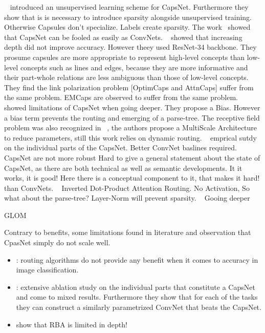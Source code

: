 \documentclass{article}
\begin{document}
~\cite{corr/Rawlinson2018} introduced an unsupervised learning scheme for CapsNet. Furthermore they show that is is necessary to introduce sparsity alongside unsupervised training. Otherwise Capsules don't specialize. Labels create sparsity.
The work~\cite{corr/Michels19} showed that CapsNet can be fooled as easily as ConvNets.
~\cite{acml/PaikKK19} showed that increasing depth did not improve accuracy. However theey used ResNet-34 backbone. They prosume
capsules are more appropriate to represent high-level concepts than low-level concepts
such as lines and edges, because they are more informative and their part-whole
relations are less ambiguous than those of low-level concepts. They find the link polarization problem [OptimCaps and AttnCaps] suffer from the same problem. EMCaps are observed to suffer from the same problem.
~\cite{prl/PeerSR21} showed limitations of CapsNet when going deeper. They propose a Bias. However a bias term prevents the routing and emerging of a parse-tree.
The receptive field problem was also recognized in ~\cite{spl/XiangZTZX18}, the authors propose a MultiScale Architecture to reduce parameters, still this work relies on dynamic routing.
~\cite{cvpr/GuT021} emprical sutdy on the individual parts of the CapsNet. Better ConvNet baslines required. CapsNet are not more robust 
Hard to give a general statement about the state of CapsNet, as there are both technical as well as semantic developments.
It it works, it is good! Here there is a conceptual component to it, that makes it hard!
than ConvNets.
~\cite{iclr/TsaiSGS20} Inverted Dot-Product Attention Routing. No Activation, So what about the parse-tree? Layer-Norm will prevent sparsity.
~\cite{cvpr/RajasegaranJJJS19} Gooing deeper

GLOM ~\cite{corr/Hinton2021}

Contrary to benefits, some limitations found in literature and observation that CpasNet simply do not scale well.
\begin{itemize}
	\item \cite{acml/PaikKK19}: routing algorithms do not provide any benefit when it comes to accuracy in image classification.
	\item \cite{cvpr/GuT021}: extensive ablation study on the individual parts that constitute a CapsNet and come to mixed results. Furthermore they show that for each of the tasks they can construct a similarly parametrized ConvNet that beats the CapsNet.
	\item \cite{prl/PeerSR21} show that RBA is limited in depth!
\end{itemize}
\end{document}
